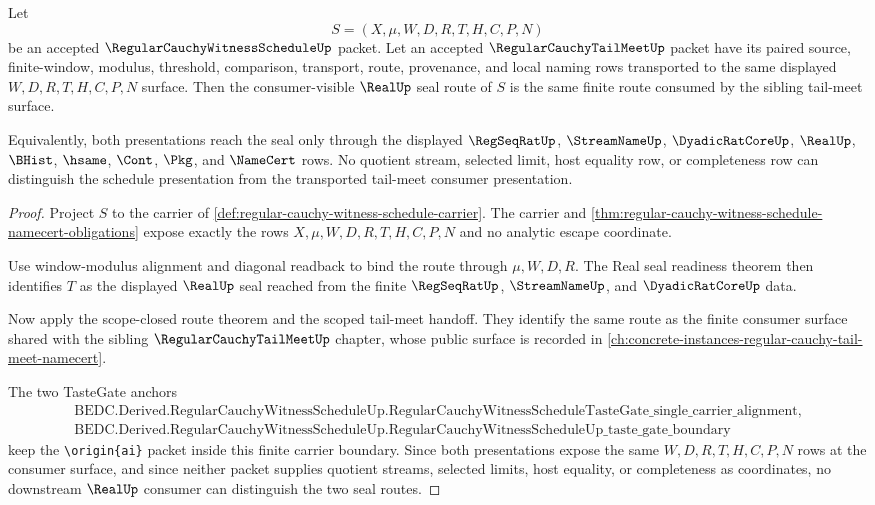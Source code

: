 \begin{theorem}
\label{thm:regular-cauchy-witness-schedule-tail-meet-seal-comparison}
Let
$$
S=(X,\mu,W,D,R,T,H,C,P,N)
$$
be an accepted $\RegularCauchyWitnessScheduleUp$ packet. Let an accepted $\RegularCauchyTailMeetUp$ packet have its paired source, finite-window, modulus, threshold, comparison, transport, route, provenance, and local naming rows transported to the same displayed $W,D,R,T,H,C,P,N$ surface. Then the consumer-visible $\RealUp$ seal route of $S$ is the same finite route consumed by the sibling tail-meet surface.

Equivalently, both presentations reach the seal only through the displayed $\RegSeqRatUp$, $\StreamNameUp$, $\DyadicRatCoreUp$, $\RealUp$, $\BHist$, $\hsame$, $\Cont$, $\Pkg$, and $\NameCert$ rows. No quotient stream, selected limit, host equality row, or completeness row can distinguish the schedule presentation from the transported tail-meet consumer presentation.
\end{theorem}
\begin{proof}
Project $S$ to the carrier of \autoref{def:regular-cauchy-witness-schedule-carrier}. The carrier and \autoref{thm:regular-cauchy-witness-schedule-namecert-obligations} expose exactly the rows $X,\mu,W,D,R,T,H,C,P,N$ and no analytic escape coordinate.

Use window-modulus alignment and diagonal readback to bind the route through $\mu,W,D,R$. The Real seal readiness theorem then identifies $T$ as the displayed $\RealUp$ seal reached from the finite $\RegSeqRatUp$, $\StreamNameUp$, and $\DyadicRatCoreUp$ data.

Now apply the scope-closed route theorem and the scoped tail-meet handoff. They identify the same route as the finite consumer surface shared with the sibling $\RegularCauchyTailMeetUp$ chapter, whose public surface is recorded in \autoref{ch:concrete-instances-regular-cauchy-tail-meet-namecert}.

The two TasteGate anchors
$$
\begin{gathered}
\text{BEDC.Derived.RegularCauchyWitnessScheduleUp.RegularCauchyWitnessScheduleTasteGate\_single\_carrier\_alignment},\\
\text{BEDC.Derived.RegularCauchyWitnessScheduleUp.RegularCauchyWitnessScheduleUp\_taste\_gate\_boundary}
\end{gathered}
$$
keep the \texttt{\textbackslash origin\{ai\}} packet inside this finite carrier boundary. Since both presentations expose the same $W,D,R,T,H,C,P,N$ rows at the consumer surface, and since neither packet supplies quotient streams, selected limits, host equality, or completeness as coordinates, no downstream $\RealUp$ consumer can distinguish the two seal routes.
\end{proof}

